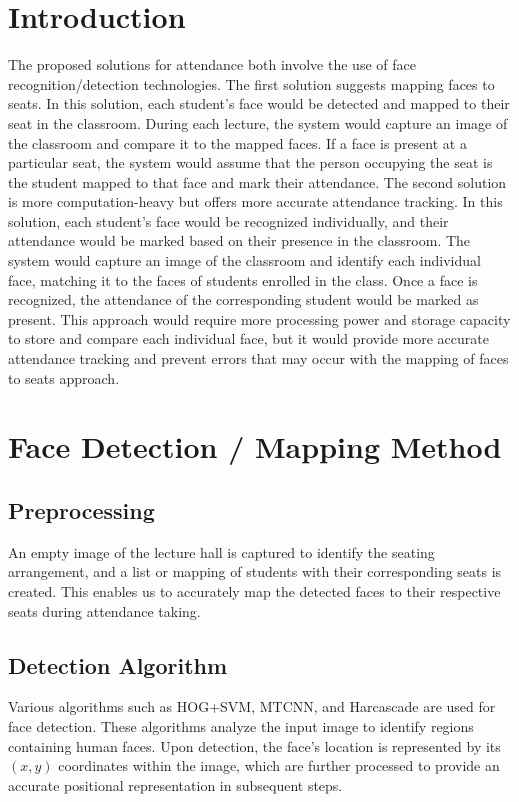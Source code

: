 \section*{Introduction}
The proposed solutions for attendance both involve the use of face recognition/detection technologies. 
\newline
The first solution suggests mapping faces to seats. In this solution, each student's face would be detected and mapped to their seat in the classroom. During each lecture, the system would capture an image of the classroom and compare it to the mapped faces. If a face is present at a particular seat, the system would assume that the person occupying the seat is the student mapped to that face and mark their attendance.
\newline
The second solution is more computation-heavy but offers more accurate attendance tracking. In this solution, each student's face would be recognized individually, and their attendance would be marked based on their presence in the classroom. The system would capture an image of the classroom and identify each individual face, matching it to the faces of students enrolled in the class. Once a face is recognized, the attendance of the corresponding student would be marked as present. This approach would require more processing power and storage capacity to store and compare each individual face, but it would provide more accurate attendance tracking and prevent errors that may occur with the mapping of faces to seats approach.

\section{Face Detection / Mapping Method}
\subsection{Preprocessing}
An empty image of the lecture hall is captured to identify the seating arrangement, and a list or mapping of students with their corresponding seats is created. This enables us to accurately map the detected faces to their respective seats during attendance taking.
\subsection{Detection Algorithm}
Various algorithms such as HOG+SVM, MTCNN, and Harcascade are used for face detection. These algorithms analyze the input image to identify regions containing human faces. Upon detection, the face's location is represented by its $(x,y)$ coordinates within the image, which are further processed to provide an accurate positional representation in subsequent steps.

